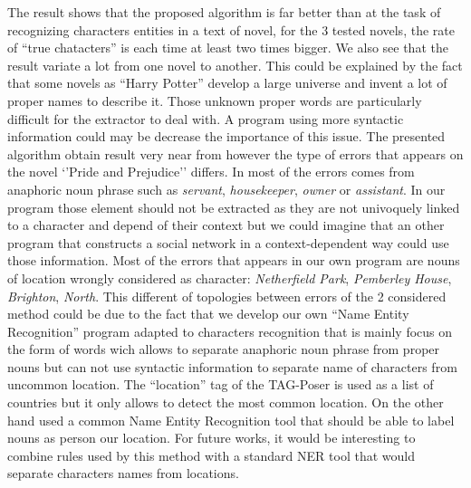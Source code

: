 \documentclass[a4paper, 12pt]{report}
\begin{document}
\begin{table}
\center
\caption{Number of detected character that refers to actual characters(true positive).}\label{tab1}

\end{table}


The result shows that the proposed algorithm is far better than \cite{original} at the task of recognizing characters entities in a text of
 novel, for the 3 tested novels, the rate of ``true chatacters'' is each time at least two times bigger. We also see that the result variate
 a lot from one novel to another. 
 This could be explained by the fact that some novels as ``Harry Potter'' develop a large universe and invent a lot of proper names to describe it. 
 Those unknown proper words are particularly difficult for the extractor to deal with. A program using more syntactic information could may be decrease the importance of this issue. 
 The presented algorithm obtain result very near from \cite{character_meta} however the type of errors that appears on the novel `'Pride and Prejudice'' differs. In \cite{character_meta} most of the errors comes from anaphoric noun phrase such as \textit{servant}, \textit{housekeeper}, \textit{owner} or \textit{assistant}. In our program those element should not be extracted as they are not univoquely linked to a character and depend of their context but we could imagine that an other program that constructs a social network in a context-dependent way could use those information. Most of the errors that appears in our own  program are nouns of location wrongly considered as character: \textit{Netherfield Park}, \textit{Pemberley House}, \textit{Brighton}, \textit{North}. 
 This different of topologies between errors of the 2 considered method could be due to the fact that we develop our own ``Name Entity Recognition'' program adapted to characters recognition that is mainly focus on the form of words wich allows to separate anaphoric noun phrase from proper nouns but can not use syntactic information to separate name of characters from uncommon location. The ``location'' tag of the TAG-Poser is used as a list of countries but it only allows to detect the most common location. On the other hand \cite{structure_clustering} used a common Name Entity Recognition tool that should be able to label nouns as person our location. For future works, it would be interesting to combine rules used by this method with a standard NER tool that would separate characters names from locations. \\
\end{document}
